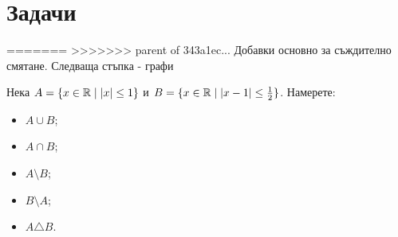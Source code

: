 \section{Задачи}
=======
>>>>>>> parent of 343a1ec... Добавки основно за съждително смятане. Следваща стъпка - графи

\begin{problem}
  Нека $A = \{x\in\mathbb{R}\mid |x|\leq 1\}$ и $B = \{x\in\mathbb{R}\mid |x-1|\leq \frac{1}{2}\}$.
  Намерете:
  \begin{itemize}
  \item 
    $A\cup B$;
  \item
    $A\cap B$;
  \item
    $A\setminus B$;
  \item
    $B\setminus A$;
  \item
    $A \triangle B$.
  \end{itemize}
\end{problem}






